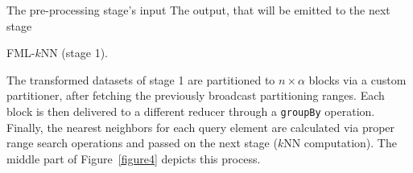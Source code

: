 \begin{algorithm}[h!]
	\scriptsize
	\DontPrintSemicolon
	\Comment The pre-processing stage's input \;
	\Comment The output, that will be emitted to the next stage \;
	\BlankLine
	\caption{FML-$k$NN (stage 1).}
	\label{alg:single_session_algorithm_stage1}	
\end{algorithm}

\label{par:algorithmic2}
The transformed datasets of stage 1 are partitioned to $n \times \alpha$ blocks via a custom partitioner, after fetching the previously broadcast partitioning ranges. Each block is then delivered to a different reducer through a \texttt{groupBy} operation. Finally, the nearest neighbors for each query element are calculated via proper range search operations and passed on the next stage ($k$NN computation). The middle part of Figure~\ref{figure4} depicts this process.

